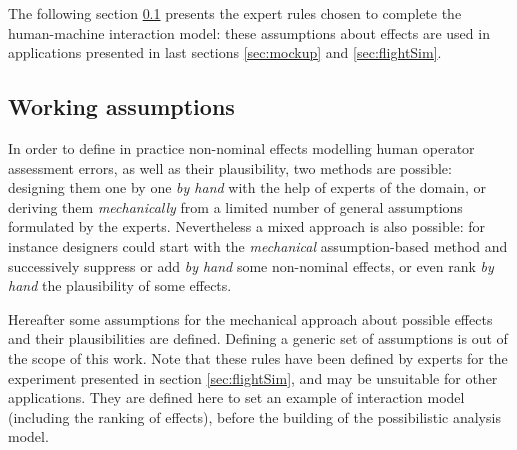 The following section \ref{workingAssumptions} 
presents the expert rules chosen 
to complete the human-machine interaction model:
these assumptions about effects are
used in applications presented in last sections 
\ref{sec:mockup} and \ref{sec:flightSim}.


\subsection{Working assumptions}
\label{workingAssumptions}

In order to define in practice non-nominal effects 
modelling human operator assessment errors,
as well as their plausibility, two methods are possible: 
designing them one by one \textit{by hand} with the help of experts of the domain, 
or deriving them \textit{mechanically} from a limited number of general assumptions formulated by the experts.
Nevertheless a mixed approach is also possible: 
for instance designers could start with the \textit{mechanical} assumption-based method 
and successively suppress or add \textit{by hand} some non-nominal effects, 
or even rank \textit{by hand} the plausibility of some effects.

Hereafter some assumptions for the mechanical approach about possible effects and their plausibilities are defined. 
Defining a generic set of assumptions is out of the scope 
of this work. Note that these rules have been defined by experts for
the experiment presented in section \ref{sec:flightSim}, and may be unsuitable for other applications. 
They are defined here to set an example of interaction model 
(including the ranking of effects), before the building of the possibilistic analysis model.

